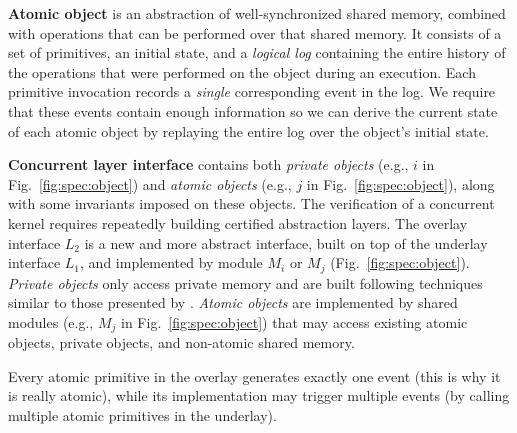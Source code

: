 {\bf Atomic object} is an abstraction of well-synchronized shared
memory, combined with operations that can be performed over that
shared memory.  It consists of a set of primitives, an initial state,
and a \emph{logical log} containing the entire history of the
operations that were performed on the object during an execution. Each
primitive invocation records a \emph{single} corresponding event in
the log.  We require that these events contain enough information so
we can derive the current state of each atomic object by replaying the
entire log over the object's initial state.

{\bf Concurrent layer interface} contains both \emph{private
  objects} (e.g., $i$ in Fig.~\ref{fig:spec:object}) and \emph{atomic
  objects} (e.g., $j$ in Fig.~\ref{fig:spec:object}), along with some
invariants imposed on these objects.  The verification of a concurrent
kernel requires repeatedly building certified abstraction layers.  The
overlay interface $L_2$ is a new and more abstract interface, built on
top of the underlay interface $L_1$, and implemented by module $M_i$
or $M_j$ (\cf Fig.~\ref{fig:spec:object}).  \emph{Private objects}
only access private memory and are built following techniques similar
to those presented by \citet{dscal15}.  \emph{Atomic objects} are
implemented by shared modules (e.g., $M_j$ in
Fig.~\ref{fig:spec:object}) that may access existing atomic objects,
private objects, and non-atomic shared memory.

Every atomic primitive in the overlay generates exactly one event
(this is why it is really atomic), while its implementation may
trigger multiple events (by calling multiple atomic primitives in the
underlay).


